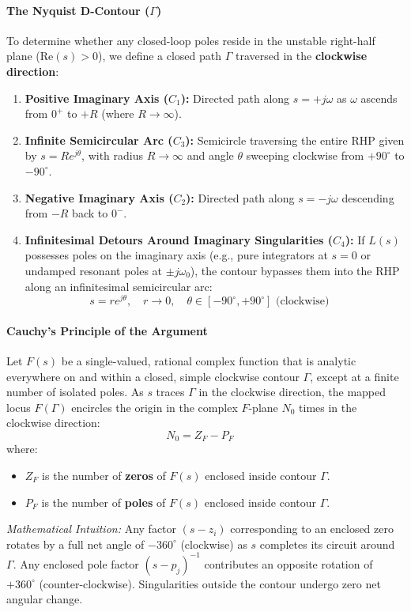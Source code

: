 \documentclass[12pt,onecolumn,twoside ]{article}
\begin{document}
	\paragraph{The Nyquist D-Contour ($\Gamma$)}
	To determine whether any closed-loop poles reside in the unstable right-half plane ($\text{Re}(s) > 0$), we define a closed path $\Gamma$ traversed in the \textbf{clockwise direction}:
	\begin{enumerate}
		\item
		\textbf{Positive Imaginary Axis ($C_1$):} Directed path along $s = +j\omega$ as $\omega$ ascends from $0^+$ to $+R$ (where $R \to \infty$).
		\item
		\textbf{Infinite Semicircular Arc ($C_3$):} Semicircle traversing the entire RHP given by $s = R e^{j\theta}$, with radius $R \to \infty$ and angle $\theta$ sweeping clockwise from $+90^\circ$ to $-90^\circ$.
		\item
		\textbf{Negative Imaginary Axis ($C_2$):} Directed path along $s = -j\omega$ descending from $-R$ back to $0^-$.
		\item
		\textbf{Infinitesimal Detours Around Imaginary Singularities ($C_4$):} If $L(s)$ possesses poles on the imaginary axis (e.g., pure integrators at $s = 0$ or undamped resonant poles at $\pm j\omega_0$), the contour bypasses them into the RHP along an infinitesimal semicircular arc: \[
		s = r e^{j\theta}, \quad r \to 0, \quad \theta \in [-90^\circ, +90^\circ] \text{ (clockwise)} \quad
		\]
	\end{enumerate}
	\paragraph{Cauchy’s Principle of the Argument}
	Let $F(s)$ be a single-valued, rational complex function that is analytic everywhere on and within a closed, simple clockwise contour $\Gamma$, except at a finite number of isolated poles. As $s$ traces $\Gamma$ in the clockwise direction, the mapped locus $F(\Gamma)$ encircles the origin in the complex $F$-plane $N_0$ times in the clockwise direction: \[
	N_0 = Z_F - P_F \quad
	\] where:
	\begin{itemize}
		\item
		$Z_F$ is the number of \textbf{zeros} of $F(s)$ enclosed inside contour $\Gamma$.
		\item
		$P_F$ is the number of \textbf{poles} of $F(s)$ enclosed inside contour $\Gamma$.
	\end{itemize}
	\textit{Mathematical Intuition:} Any factor $(s - z_i)$ corresponding to an enclosed zero rotates by a full net angle of $-360^\circ$ (clockwise) as $s$ completes its circuit around $\Gamma$. Any enclosed pole factor $(s - p_j)^{-1}$ contributes an opposite rotation of $+360^\circ$ (counter-clockwise). Singularities outside the contour undergo zero net angular change.
\end{document}
